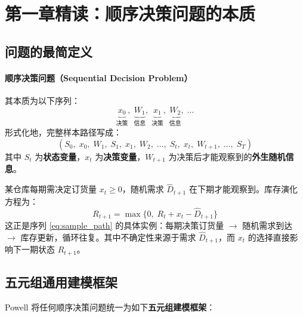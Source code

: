 \documentclass[11pt, a4paper]{article}
\begin{document}
\section{第一章精读：顺序决策问题的本质}

\subsection{问题的最简定义}

\paragraph{顺序决策问题（Sequential Decision Problem）} 其本质为以下序列：
\[
  \underbrace{x_0}_{\text{决策}},\; 
  \underbrace{W_1}_{\text{信息}},\; 
  \underbrace{x_1}_{\text{决策}},\; 
  \underbrace{W_2}_{\text{信息}},\; \ldots
\]
形式化地，完整样本路径写成：
\begin{equation}
  (S_0,\; x_0,\; W_1,\; S_1,\; x_1,\; W_2,\; \ldots,\; S_t,\; x_t,\; W_{t+1},\; \ldots,\; S_T)
  \label{eq:sample_path}
\end{equation}
其中 $S_t$ 为\textbf{状态变量}，$x_t$ 为\textbf{决策变量}，$W_{t+1}$ 为决策后才能观察到的\textbf{外生随机信息}。

\begin{tcolorbox}[scenariobox, title={场景一：库存管理（最经典的顺序决策问题）}]
某仓库每期需决定订货量 $x_t \geq 0$，随机需求 $\hat{D}_{t+1}$ 在下期才能观察到。库存演化方程为：
\begin{equation}
  R_{t+1} = \max\{0,\; R_t + x_t - \hat{D}_{t+1}\}
  \label{eq:inventory}
\end{equation}
这正是序列 \eqref{eq:sample_path} 的具体实例：每期决策订货量 $\to$ 随机需求到达 $\to$ 库存更新，循环往复。其中不确定性来源于需求 $\hat{D}_{t+1}$，而 $x_t$ 的选择直接影响下一期状态 $R_{t+1}$。
\end{tcolorbox}

\subsection{五元组通用建模框架}

Powell 将任何顺序决策问题统一为如下\textbf{五元组建模框架}：
\end{document}
